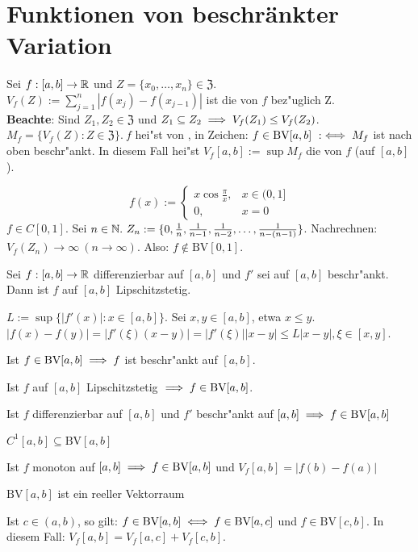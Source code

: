 \documentclass[a4paper,twoside,DIV15,BCOR12mm]{scrbook}
\begin{document}
\def\Z{\ensuremath{\mathfrak{Z}}}
\def\hin{\item["`$\Rightarrow$"':]}
\def\zurueck{\item["`$\Leftarrow$"':]}
\def\BV{\text{BV}}
\def\dx{\text{d}x}

\chapter{Funktionen von beschränkter Variation}

\begin{definition}
Sei $f:[a,b]\to\mathbb{R}$ und $Z=\{x_0,\ldots,x_n\} \in\Z$. $V_f(Z):=\sum_{j=1}^n|f(x_j)-f(x_{j-1})|$ ist die  von $f$ bez"uglich Z.\\
\textbf{Beachte}: Sind $Z_1,Z_2 \in \Z$ und $Z_1 \subseteq Z_2\implies V_f(Z_1) \le V_f(Z_2)$. $M_f=\{V_f(Z):Z \in \Z\}.\ f$ hei"st von , in Zeichen: $f\in\BV[a,b]\ :\equizu M_f$ ist nach oben beschr"ankt. In diesem Fall hei"st $V_f[a,b]:=\sup M_f$ die  von $f$ (auf $[a,b]$). 
\end{definition}

\begin{beispiel}
$$f(x) := \begin{cases}
x\cos\frac{\pi}{x},&x \in (0,1]\\
0,&x=0\end{cases}$$
$f \in C[0,1]$. Sei $n\in\MdN.\ Z_n:=\{0,\frac{1}{n},\frac{1}{n-1},\frac{1}{n-2},\ldots,\frac{1}{n-(n-1)}\}$. Nachrechnen: $V_f(Z_n)\to\infty\ (n\to\infty)$. Also: $f \notin \BV[0,1]$.
\end{beispiel}

\begin{hilfssatz}
Sei $f:[a,b]\to\mathbb{R}$ differenzierbar auf $[a,b]$ und $f'$ sei auf $[a,b]$ beschr"ankt. Dann ist $f$ auf $[a,b]$ Lipschitzstetig.
\end{hilfssatz}

\begin{beweis}
$L:=\sup\{|f'(x)|:x\in[a,b]\}$. Sei $x,y\in[a,b]$, etwa $x\le y$. $|f(x)-f(y)|=|f'(\xi)(x-y)|=|f'(\xi)||x-y|\le L|x-y|,\xi \in [x,y]$.
\end{beweis}

\begin{satz}[Varianzeigenschaften]
\begin{liste}
\item Ist $f \in\BV[a,b]\folgt f$ ist beschr"ankt auf $[a,b]$.
\item Ist $f$ auf $[a,b]$ Lipschitzstetig $\folgt f\in\BV[a,b]$.
\item Ist $f$ differenzierbar auf $[a,b]$ und $f'$ beschr"ankt auf $[a,b]\folgt f\in\BV[a,b]$
\item $C^1[a,b]\subseteq \BV[a,b]$
\item Ist $f$ monoton auf $[a,b]\folgt f\in\BV[a,b]$ und $V_f[a,b]=|f(b)-f(a)|$
\item $\BV[a,b]$ ist ein reeller Vektorraum
\item Ist $c \in (a,b)$, so gilt: $f\in\BV[a,b] \equizu f\in\BV[a,c]$ und $f\in\BV[c,b]$. In diesem Fall: $V_f[a,b]=V_f[a,c]+V_f[c,b]$.
\end{liste}
\end{satz}
\end{document}
